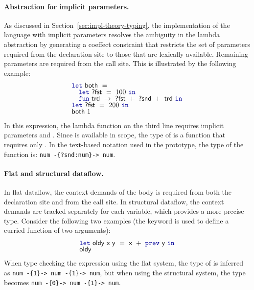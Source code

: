 \paragraph{Abstraction for implicit parameters.}
As discussed in Section~\ref{sec:impl-theory-typing}, the implementation of the language with
implicit parameters resolves the ambiguity in the lambda abstraction by generating a coeffect
constraint that restricts the set of parameters required from the declaration site to those that
are lexically available. Remaining parameters are required from the call site. This is illustrated
by the following example:
%
\begin{equation*}
\begin{array}{l}
\kvd{let}~\ident{both}~=\\[-0.25em]
\quad \kvd{let}~\ident{?fst}~=~100~\kvd{in}\\[-0.25em]
\quad \kvd{fun}~\ident{trd}~\rightarrow~\ident{?fst}~+~\ident{?snd}~+~\ident{trd}~\kvd{in}\\[-0.25em]
\kvd{let}~\ident{?fst}~=~200~\kvd{in}\\[-0.25em]
\ident{both}~1
\end{array}
\end{equation*}
%
In this expression, the lambda function on the third line requires implicit parameters  and
. Since  is available in scope, the type of  is a function that
requires only . In the text-based notation used in the prototype, the type of the
function  is: {\tt num -\{?snd:num\}-> num}.

\vspace{-0.5em}
\paragraph{Flat and structural dataflow.}
In flat dataflow, the context demands of the body is required from both the declaration site
and from the call site. In structural dataflow, the context demands are tracked separately
for each variable, which provides a more precise type. Consider the following two examples (the
 keyword is used to define a curried function of two arguments):
%
\begin{equation*}
\begin{array}{l}
\kvd{let}~\ident{oldy}~\ident{x}~\ident{y}~=~\ident{x}~+~\kvd{prev}~\ident{y}~\kvd{in}\\[-0.25em]
\ident{oldy}
\end{array}
\end{equation*}
%
When type checking the expression using the flat system, the type of  is inferred as {\tt num -\{1\}-> num -\{1\}-> num},
but when using the structural system, the type becomes {\tt num -\{0\}-> num -\{1\}-> num}.


